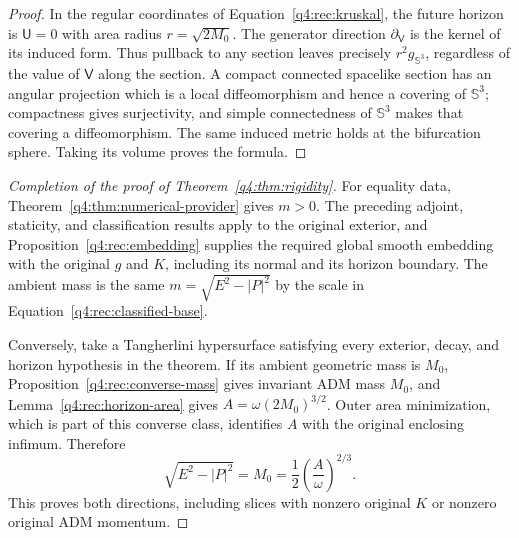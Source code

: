 \begin{proof}
In the regular coordinates of Equation~\eqref{q4:rec:kruskal}, the future
horizon is $\mathsf U=0$ with area radius $r=\sqrt{2M_0}$.  The generator
direction $\partial_{\mathsf V}$ is the kernel of its induced form.  Thus
pullback to any section leaves precisely $r^2g_{\mathbb S^3}$, regardless
of the value of $\mathsf V$ along the section.  A compact connected spacelike
section has an angular projection which is a local diffeomorphism and hence
a covering of $\mathbb S^3$; compactness gives surjectivity, and simple
connectedness of $\mathbb S^3$ makes that covering a diffeomorphism.  The
same induced metric holds at the bifurcation sphere.  Taking its volume
proves the formula.
\end{proof}

\begin{proof}[Completion of the proof of Theorem~\ref{q4:thm:rigidity}]
For equality data, Theorem~\ref{q4:thm:numerical-provider} gives $m>0$.
The preceding adjoint, staticity, and classification results apply to the
original exterior, and Proposition~\ref{q4:rec:embedding} supplies the required
global smooth embedding with the original $g$ and $K$, including its normal
and its horizon boundary.  The ambient mass is the same
$m=\sqrt{E^2-|P|^2}$ by the scale in
Equation~\eqref{q4:rec:classified-base}.

Conversely, take a Tangherlini hypersurface satisfying every exterior,
decay, and horizon hypothesis in the theorem.  If its ambient geometric
mass is $M_0$, Proposition~\ref{q4:rec:converse-mass} gives invariant ADM mass
$M_0$, and Lemma~\ref{q4:rec:horizon-area} gives
$A=\omega(2M_0)^{3/2}$.  Outer area minimization, which is part of this
converse class, identifies $A$ with the original enclosing infimum.
Therefore
\[
 \sqrt{E^2-|P|^2}=M_0
   =\frac12\left(\frac A\omega\right)^{2/3}.
\]
This proves both directions, including slices with nonzero original $K$
or nonzero original ADM momentum.
\end{proof}
